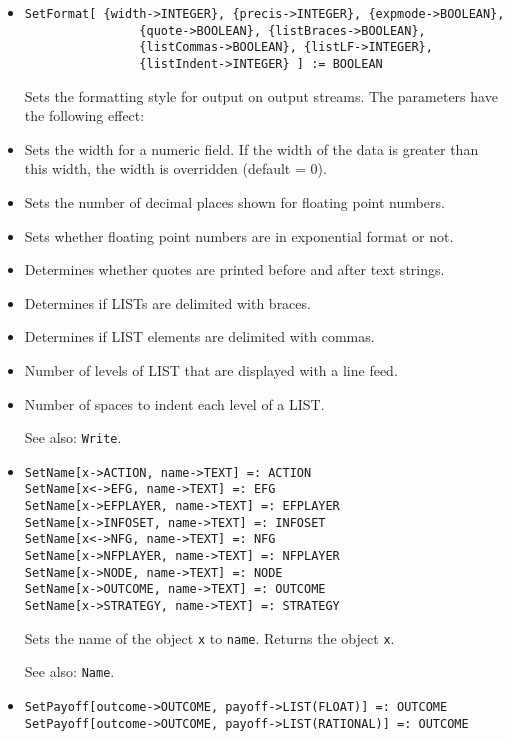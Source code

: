 \begin{itemize}
\item
\protect \large \begin{verbatim}
SetFormat[ {width->INTEGER}, {precis->INTEGER}, {expmode->BOOLEAN},
                {quote->BOOLEAN}, {listBraces->BOOLEAN},
                {listCommas->BOOLEAN}, {listLF->INTEGER},
                {listIndent->INTEGER} ] := BOOLEAN
\end{verbatim}\normalsize

\bd Sets the formatting style for output on output streams.  The
parameters have the following effect:
\bd
\item[\verb+width+] Sets the width for a numeric field. If the width
of the data is greater than this width, the width is overridden (default = 0).
\item[\verb+precis+] Sets the number of decimal places shown for floating
point numbers.
\item[\verb+expmode+] Sets whether floating point numbers are in
exponential format or not.
\item[\verb+quote+] Determines whether quotes are printed before and
after text strings.
\item[\verb+listBraces+] Determines if LISTs are delimited with
braces.
\item[\verb+listCommas+] Determines if LIST elements are delimited
with commas.
\item[\verb+listLF+] Number of levels of LIST that are displayed with
a line feed.  
\item[\verb+listIndent+] Number of spaces to indent each level of a
LIST. 
\ed

\item
[See also:] {\tt Write}.
\ed

\item
\protect \large \begin{verbatim}
SetName[x->ACTION, name->TEXT] =: ACTION
SetName[x<->EFG, name->TEXT] =: EFG
SetName[x->EFPLAYER, name->TEXT] =: EFPLAYER
SetName[x->INFOSET, name->TEXT] =: INFOSET
SetName[x<->NFG, name->TEXT] =: NFG
SetName[x->NFPLAYER, name->TEXT] =: NFPLAYER
SetName[x->NODE, name->TEXT] =: NODE
SetName[x->OUTCOME, name->TEXT] =: OUTCOME
SetName[x->STRATEGY, name->TEXT] =: STRATEGY
\end{verbatim}\normalsize

\bd
Sets the name of the object \verb+x+ to \verb+name+.
Returns the object \verb+x+.
\item
[See also:] {\tt Name}.
\ed

\item
\protect \large \begin{verbatim}
SetPayoff[outcome->OUTCOME, payoff->LIST(FLOAT)] =: OUTCOME
SetPayoff[outcome->OUTCOME, payoff->LIST(RATIONAL)] =: OUTCOME
\end{verbatim}\normalsize


\end{itemize}
